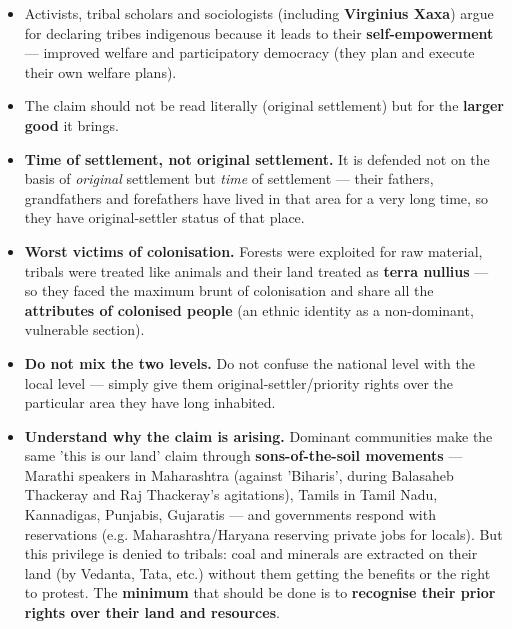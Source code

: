 \begin{KeyConcept}
\begin{itemize}
\item Activists, tribal scholars and sociologists (including \textbf{Virginius Xaxa}) argue for declaring tribes indigenous because it leads to their \textbf{self-empowerment} --- improved welfare and participatory democracy (they plan and execute their own welfare plans).
\item The claim should not be read literally (original settlement) but for the \textbf{larger good} it brings.
\end{itemize}
\end{KeyConcept}

\begin{itemize}
\item \textbf{Time of settlement, not original settlement.} It is defended not on the basis of \emph{original} settlement but \emph{time} of settlement --- their fathers, grandfathers and forefathers have lived in that area for a very long time, so they have original-settler status of that place.
\item \textbf{Worst victims of colonisation.} Forests were exploited for raw material, tribals were treated like animals and their land treated as \textbf{terra nullius} --- so they faced the maximum brunt of colonisation and share all the \textbf{attributes of colonised people} (an ethnic identity as a non-dominant, vulnerable section).
\item \textbf{Do not mix the two levels.} Do not confuse the national level with the local level --- simply give them original-settler/priority rights over the particular area they have long inhabited.
\item \textbf{Understand why the claim is arising.} Dominant communities make the same 'this is our land' claim through \textbf{sons-of-the-soil movements} --- Marathi speakers in Maharashtra (against 'Biharis', during Balasaheb Thackeray and Raj Thackeray's agitations), Tamils in Tamil Nadu, Kannadigas, Punjabis, Gujaratis --- and governments respond with reservations (e.g. Maharashtra/Haryana reserving private jobs for locals). But this privilege is denied to tribals: coal and minerals are extracted on their land (by Vedanta, Tata, etc.) without them getting the benefits or the right to protest. The \textbf{minimum} that should be done is to \textbf{recognise their prior rights over their land and resources}.
\end{itemize}

